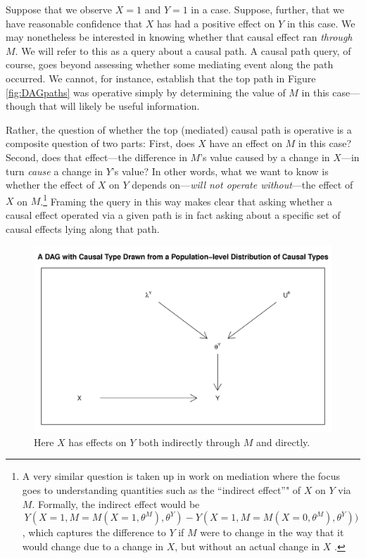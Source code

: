 \documentclass[12pt,]{book}
\let\rmarkdownfootnote\footnote%
\def\footnote{\protect\rmarkdownfootnote}
\begin{document}
Suppose that we observe \(X=1\) and \(Y=1\) in a case. Suppose, further, that we have reasonable confidence that \(X\) has had a positive effect on \(Y\) in this case. We may nonetheless be interested in knowing whether that causal effect ran \emph{through} \(M\). We will refer to this as a query about a causal path. A causal path query, of course, goes beyond assessing whether some mediating event along the path occurred. We cannot, for instance, establish that the top path in Figure \ref{fig:DAGpaths} was operative simply by determining the value of \(M\) in this case---though that will likely be useful information.

Rather, the question of whether the top (mediated) causal path is operative is a composite question of two parts: First, does \(X\) have an effect on \(M\) in this case? Second, does that effect---the difference in \(M\)'s value caused by a change in \(X\)---in turn \emph{cause} a change in \(Y\)'s value? In other words, what we want to know is whether the effect of \(X\) on \(Y\) depends on---\emph{will not operate without}---the effect of \(X\) on \(M\).\footnote{A very similar question is taken up in work on mediation where the focus goes to understanding quantities such as the ``indirect effect''" of \(X\) on \(Y\) via \(M\). Formally, the indirect effect would be \[Y(X=1, M = M(X=1,\theta^M), 
  \theta^Y) - Y(X = 1, M = M(X=0, \theta^M), \theta^Y))\], which captures the difference to \(Y\) if \(M\) were to change in the way that it would change due to a change in \(X\), but without an actual change in \(X\) \citep[ p 132, \citet{imai2010general}]{pearl2009causality}.} Framing the query in this way makes clear that asking whether a causal effect operated via a given path is in fact asking about a specific set of causal effects lying along that path.

\begin{figure}

{\centering \includegraphics[width=.5\textwidth]{ii_files/figure-latex/unnamed-chunk-17-1} 

}

\caption{\label{fig:DAGpaths} Here $X$ has effects on $Y$ both indirectly through $M$ and directly.}\label{fig:unnamed-chunk-17}
\end{figure}
\end{document}

